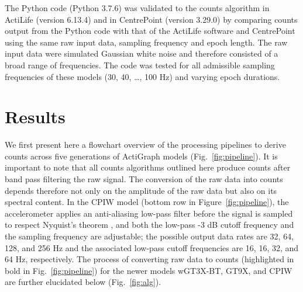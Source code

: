 \documentclass{bmcart}
\begin{document}
The Python code (Python 3.7.6) was validated to the counts algorithm in
ActiLife (version 6.13.4) and in CentrePoint (version 3.29.0) by comparing
counts output from the Python code with that of the ActiLife software and
CentrePoint using the same raw input data, sampling frequency and epoch length.
The raw input data were simulated Gaussian white noise and therefore consisted
of a broad range of frequencies. The code was tested for all admissible
sampling frequencies of these models (30, 40, \ldots, 100 Hz) and varying epoch
durations.

\section*{Results}
We first present here a flowchart overview of the processing pipelines to
derive counts across five generations of ActiGraph models
(Fig.~\ref{fig:pipeline}). It is important to note that all counts algorithms
outlined here produce counts after band pass filtering the raw signal. The
conversion of the raw data into counts depends therefore not only on the
amplitude of the raw data but also on its spectral content. In the CPIW model
(bottom row in Figure~\ref{fig:pipeline}), the accelerometer applies an
anti-aliasing low-pass filter before the signal is sampled to respect Nyquist's
theorem \cite{shannon_communication_1949}, and both the low-pass -3 dB cutoff
frequency and the sampling frequency are adjustable; the possible output data
rates are 32, 64, 128, and 256 Hz and the associated low-pass cutoff
frequencies are 16, 16, 32, and 64 Hz, respectively. The process of converting
raw data to counts (highlighted in bold in Fig.~\ref{fig:pipeline}) for the
newer models wGT3X-BT, GT9X, and CPIW are further elucidated below
(Fig.~\ref{fig:alg}).
\end{document}
